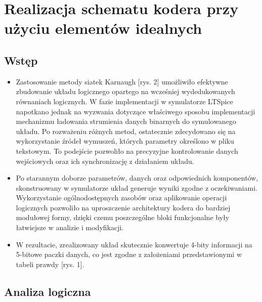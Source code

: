 \documentclass{article}
\begin{document}
\newpage

\section{Realizacja schematu kodera przy użyciu elementów idealnych}
\subsection{Wstęp}
\begin{itemize}

\item Zastosowanie metody siatek Karnaugh [rys. 2] umożliwiło efektywne zbudowanie układu logicznego opartego na wcześniej wydedukowanych równaniach logicznych. W fazie implementacji w symulatorze LTSpice napotkano jednak na wyzwania dotyczące właściwego sposobu implementacji mechanizmu ładowania strumienia danych binarnych do symulowanego układu. Po rozważeniu różnych metod, ostatecznie zdecydowano się na wykorzystanie źródeł wymuszeń, których parametry określono w pliku tekstowym. To podejście pozwoliło na precyzyjne kontrolowanie danych wejściowych oraz ich synchronizację z działaniem układu.

\item Po starannym doborze parametrów, danych oraz odpowiednich komponentów, skonstruowany w symulatorze układ generuje wyniki zgodne z oczekiwaniami. Wykorzystanie ogólnodostępnych zasobów oraz aplikowanie operacji logicznych pozwoliło na uproszczenie architektury kodera do bardziej modułowej formy, dzięki czemu poszczególne bloki funkcjonalne były łatwiejsze w analizie i modyfikacji.

\item W rezultacie, zrealizowany układ skutecznie konwertuje 4-bity informacji na 5-bitowe paczki danych, co jest zgodne z założeniami przedstawionymi w tabeli prawdy [rys. 1].
\end{itemize}
\subsection{Analiza logiczna}
\end{document}
